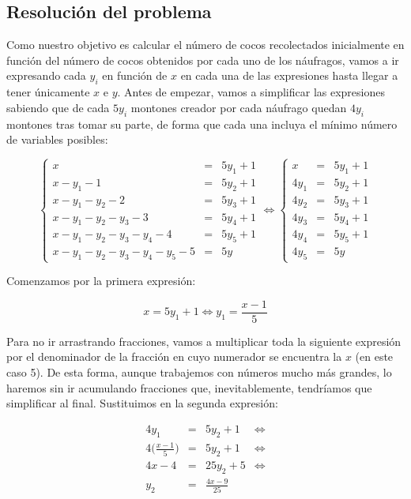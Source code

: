 \subsection*{Resolución del problema}

Como nuestro objetivo es calcular el número de cocos recolectados inicialmente en función del número de cocos obtenidos por cada uno de los náufragos, vamos a ir expresando cada $y_i$ en función de $x$ en cada una de las expresiones hasta llegar a tener únicamente $x$ e $y$.
Antes de empezar, vamos a simplificar las expresiones sabiendo que de cada $5y_i$ montones creador por cada náufrago quedan $4y_i$ montones tras tomar su parte, de forma que cada una incluya el mínimo número de variables posibles:

\[
\left\{
\begin{array}{rcl}
	x                                   & = & 5y_1 + 1 \\
	x - y_1 - 1                         & = & 5y_2 + 1 \\
	x - y_1 - y_2 - 2                   & = & 5y_3 + 1 \\
	x - y_1 - y_2 - y_3 - 3             & = & 5y_4 + 1 \\
	x - y_1 - y_2 - y_3 - y_4 - 4       & = & 5y_5 + 1 \\
	x - y_1 - y_2 - y_3 - y_4 - y_5 - 5 & = & 5y
\end{array}
\right.
\iff%
\left\{
\begin{array}{rcl}
	x    & = & 5y_1 + 1 \\
	4y_1 & = & 5y_2 + 1 \\
	4y_2 & = & 5y_3 + 1 \\
	4y_3 & = & 5y_4 + 1 \\
	4y_4 & = & 5y_5 + 1 \\
	4y_5 & = & 5y
\end{array}
\right.
\]

Comenzamos por la primera expresión:

\[x = 5y_1 + 1 \iff y_1 = \frac{x-1}{5}\]

Para no ir arrastrando fracciones, vamos a multiplicar toda la siguiente expresión por el denominador de la fracción en cuyo numerador se encuentra la $x$ (en este caso 5).
De esta forma, aunque trabajemos con números mucho más grandes, lo haremos sin ir acumulando fracciones que, inevitablemente, tendríamos que simplificar al final.
Sustituimos en la segunda expresión:

\[
\begin{array}{rcll}
	4y_1                     & = & 5y_2 + 1        & \iff \\
	4\big(\frac{x-1}{5}\big) & = & 5y_2 + 1        & \iff \\
	4x - 4                   & = & 25y_2 + 5       & \iff \\
	y_2                      & = & \frac{4x-9}{25} &
\end{array}
\]

